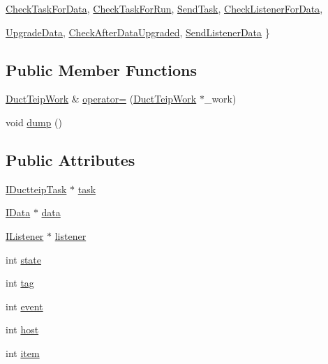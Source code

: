\begin{DoxyCompactItemize}
\hyperlink{struct_duct_teip_work_a91d3c8186e276ac3a65ecceddb852fe5aa6d12e9b917e0456c797622457bfec3b}{CheckTaskForData}, 
\hyperlink{struct_duct_teip_work_a91d3c8186e276ac3a65ecceddb852fe5ae93be4bfd9c277f297e0db4458fbd3b8}{CheckTaskForRun}, 
\hyperlink{struct_duct_teip_work_a91d3c8186e276ac3a65ecceddb852fe5a8f4c50ff6f2c28592c001fe214c3ca5e}{SendTask}, 
\hyperlink{struct_duct_teip_work_a91d3c8186e276ac3a65ecceddb852fe5a46349490f8955145ff968c7a8687cff1}{CheckListenerForData}, 
\par
\hyperlink{struct_duct_teip_work_a91d3c8186e276ac3a65ecceddb852fe5adf334b75729a0fb2f8e7052ff5bd07d4}{UpgradeData}, 
\hyperlink{struct_duct_teip_work_a91d3c8186e276ac3a65ecceddb852fe5a74e196a082d5d9c19d5081cc724d95e9}{CheckAfterDataUpgraded}, 
\hyperlink{struct_duct_teip_work_a91d3c8186e276ac3a65ecceddb852fe5aecc99ce6fdc86198c12c4f56a7d3028b}{SendListenerData}
 \}
\end{DoxyCompactItemize}
\subsection*{Public Member Functions}
\begin{DoxyCompactItemize}
\item 
\hyperlink{struct_duct_teip_work}{DuctTeipWork} \& \hyperlink{struct_duct_teip_work_a0a122f349e8c0f2815ca0c124873e60c}{operator=} (\hyperlink{struct_duct_teip_work}{DuctTeipWork} $\ast$\_\-work)
\item 
void \hyperlink{struct_duct_teip_work_a41d09a43c0fbe49dd8474799fcbd921f}{dump} ()
\end{DoxyCompactItemize}
\subsection*{Public Attributes}
\begin{DoxyCompactItemize}
\item 
\hyperlink{class_i_ductteip_task}{IDuctteipTask} $\ast$ \hyperlink{struct_duct_teip_work_a9755914b2dce56c1395379086c365103}{task}
\item 
\hyperlink{class_i_data}{IData} $\ast$ \hyperlink{struct_duct_teip_work_acdf66c310bbcc27117537420a1ea493c}{data}
\item 
\hyperlink{class_i_listener}{IListener} $\ast$ \hyperlink{struct_duct_teip_work_a2e8cae616400fd90ec9580d9df558890}{listener}
\item 
int \hyperlink{struct_duct_teip_work_acd36f1d6cc9b69134ec503adaf6465c5}{state}
\item 
int \hyperlink{struct_duct_teip_work_ac48f5639d353e33cedf01eb9fb482e2c}{tag}
\item 
int \hyperlink{struct_duct_teip_work_abbdc5253040e588d4afdcf6a7b6760ea}{event}
\item 
int \hyperlink{struct_duct_teip_work_a7fb8353e7ff6b2220a802588bc2ef0ca}{host}
\item 
int \hyperlink{struct_duct_teip_work_aa67fbaa4465bd6a7ce6bc560204ca73a}{item}
\end{DoxyCompactItemize}


